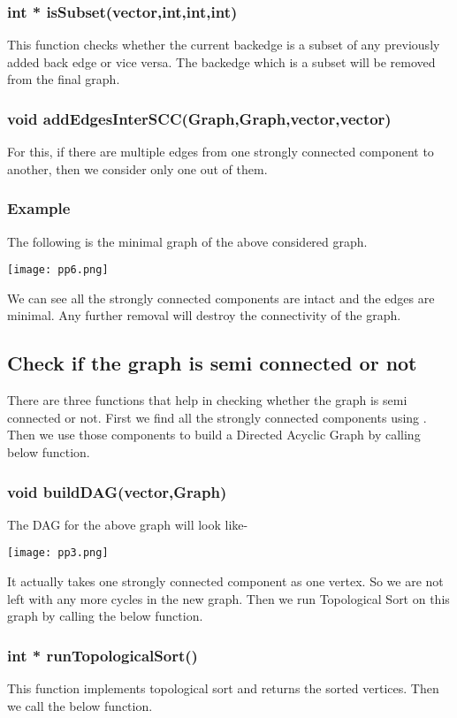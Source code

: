 \documentclass{article}
\begin{document}
\subsubsection{int * isSubset(vector,int,int,int)}
\label{reachCheck}
This function checks whether the current backedge is a subset of any previously added back edge or vice versa. The backedge which is a subset will be removed from the final graph.

\subsubsection{void addEdgesInterSCC(Graph,Graph,vector,vector)} 
For this, if there are multiple edges from one strongly connected component to another, then we consider only one out of them.

\subsubsection{Example}
The following is the minimal graph of the above considered graph.
\begin{center}
\texttt{[image: pp6.png]}
\end{center}
We can see all the strongly connected components are intact and the edges are minimal. Any further removal will destroy the connectivity of the graph.

\subsection{Check if the graph is semi connected or not}
There are three functions that help in checking whether the graph is semi connected or not. First we find all the strongly connected components using . Then we use those components to build a Directed Acyclic Graph by calling below function.
\subsubsection{void buildDAG(vector,Graph)}
\label{dag}
The DAG for the above graph will look like-
\begin{center}
\texttt{[image: pp3.png]}
\end{center}
It actually takes one strongly connected component as one vertex. So we are not left with any more cycles in the new graph. Then we run Topological Sort on this graph by calling the below function.
\subsubsection{int * runTopologicalSort()}
This function implements topological sort and returns the sorted vertices. Then we call the below function.
\end{document}
